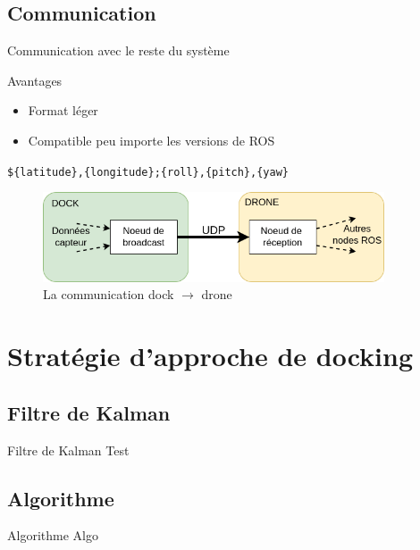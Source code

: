 \documentclass[pdftex,beamer,aspectratio=169]{beamer}
\theoremstyle{definition}
\theoremstyle{example}
\theoremstyle{plain}
\begin{document}
\subsection{Communication}

\begin{frame}[fragile]{Communication avec le reste du système}
  \centering
  \begin{minipage}{0.3\textwidth}
    \begin{exampleblock}{Avantages}
      \begin{itemize}
        \item Format léger
        \item Compatible peu importe les versions de ROS
      \end{itemize}
    \end{exampleblock}
  \end{minipage}
  \begin{minipage}{0.69\textwidth}
    \verb|${latitude},{longitude};{roll},{pitch},{yaw}|
  
    \begin{figure}[H]
      \centering
      \includegraphics[width=0.9\textwidth]{UDP_connexion.png}
      \caption{La communication dock $\rightarrow$ drone}
  \end{figure}

  \end{minipage}
\end{frame}

\section{Stratégie d'approche de docking}
\subsection{Filtre de Kalman}
\begin{frame}[fragile]{Filtre de Kalman}
  Test
\end{frame}

\subsection{Algorithme}
\begin{frame}[fragile]{Algorithme}
  Algo
\end{frame}
\end{document}
